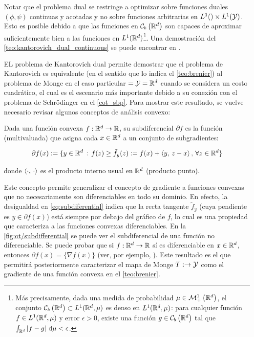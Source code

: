 Notar que el problema dual se restringe a optimizar sobre funciones duales $(\phi,\psi)$ continuas y acotadas y no sobre funciones arbitrarias en $L^1()\times L^1(\mathcal{Y})$. Esto es posible debido a que las funciones en $\mathcal{C}_b\left(\mathbb{R}^d\right)$ son capaces de aproximar suficientemente bien a las funciones en $L^1(\mathbb{R}^d)$\footnote{Más precisamente, dada una medida de probabilidad $\mu\in\mathcal{M}_+^1\left(\mathbb{R}^d\right)$, el conjunto $\mathcal{C}_b\left(\mathbb{R}^d\right)\subset L^1(\mathbb{R}^d,\mu)$ es denso en $L^1(\mathbb{R}^d,\mu)$: para cualquier función $f\in L^1(\mathbb{R}^d,\mu)$ y error $\epsilon>0$, existe una función $g\in\mathcal{C}_b\left(\mathbb{R}^d\right)$ tal que $\int_{\mathbb{R}^d} |f-g| \,\operatorname{d}\!\mu<\epsilon$.}. Una demostración del \autoref{teo:kantorovich_dual_continuous} se puede encontrar en \cite{villani2003topics}.

EL problema de Kantorovich dual permite demostrar que el problema de Kantorovich es equivalente (en el sentido que lo indica el \autoref{teo:brenier}) al problema de Monge en el caso particular $=\mathcal{Y}=\mathbb{R}^d$ cuando se considera un costo cuadrático, el cual es el escenario más importante debido a su conexión con el problema de Schrödinger en el \autoref{eot_sbp}. Para mostrar este resultado, se vuelve necesario revisar algunos conceptos de análisis convexo:

\begin{defn}[subdiferencial]
	Dada una función convexa $f:\mathbb{R}^d\to\mathbb{R}$, su subdiferencial $\partial f$ es la función (multivaluada) que asigna cada $x\in\mathbb{R}^d$ a un conjunto de subgradientes:

	\begin{equation}
		\label{eq:subdiferential}
		\partial f(x) := \{y\in\mathbb{R}^d\,:\,f(z)\geq \tilde{f}_y(z) := f(x) + \left\langle y,\,z-x\right\rangle,\,\forall z\in\mathbb{R}^d\}
	\end{equation}

	donde $\left\langle \cdot,\,\cdot\right\rangle$ es el producto interno usual en $\mathbb{R}^d$ (producto punto).
\end{defn}

Este concepto permite generalizar el concepto de gradiente a funciones convexas que no necesariamente son diferenciables en todo su dominio. En efecto, la desigualdad en \eqref{eq:subdiferential} indica que la recta tangente $\tilde{f}_y$ (cuya pendiente es $y\in\partial f(x)$) está siempre por debajo del gráfico de $f$, lo cual es una propiedad que caracteriza a las funciones convexas diferenciables. En la \autoref{fig:ot/subdifferential} se puede ver el subdiferencial de una función no diferenciable. Se puede probar que si $f:\mathbb{R}^d\to\mathbb{R}$ sí es diferenciable en $x\in\mathbb{R}^d$, entonces $\partial f(x)=\{\nabla f(x)\}$ (ver, por ejemplo, \cite{villani2003topics}). Este resultado es el que permitirá posteriormente caracterizar el mapa de Monge $T:\to\mathcal{Y}$ como el gradiente de una función convexa en el \autoref{teo:brenier}.

